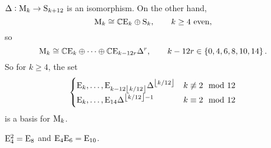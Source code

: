 \begin{corollary}
$ \Delta : \mathrm{M}_k \to \mathrm{S}_{k + 12} $ is an isomorphism. On the other hand,
$$ \mathrm{M}_k \cong \mathbb{C}\mathrm{E}_k \oplus \mathrm{S}_k, \qquad k \ge 4 \ \text{even}, $$
so
$$ \M_k \cong \CC\E_k \oplus \dots \oplus \CC\E_{k - 12r}\Delta^r, \qquad k - 12r \in \cbr{0, 4, 6, 8, 10, 14}. $$
So for $ k \ge 4 $, the set
$$
\begin{cases}
\mathrm{E}_k, \dots, \mathrm{E}_{k - 12\left\lfloor k / 12 \right\rfloor}\Delta^{\left\lfloor k / 12 \right\rfloor} & k \not\equiv 2 \mod 12 \\
\mathrm{E}_k, \dots, \mathrm{E}_{14}\Delta^{\left\lfloor k / 12 \right\rfloor - 1} & k \equiv 2 \mod 12
\end{cases}
$$
is a basis for $ \mathrm{M}_k $.
\end{corollary}

\begin{corollary}
$ \mathrm{E}_4^2 = \mathrm{E}_8 $ and $ \mathrm{E}_4\mathrm{E}_6 = \mathrm{E}_{10} $.
\end{corollary}

